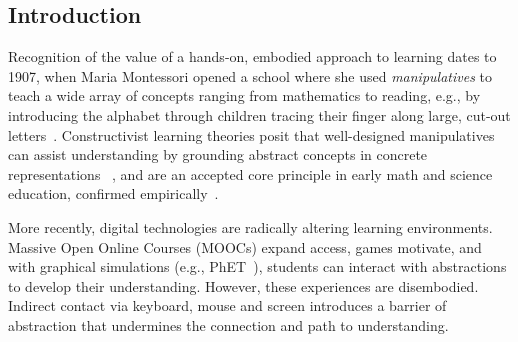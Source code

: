 %
\subsection{Introduction}
Recognition of the value of a hands-on, embodied approach to learning dates to 1907, when
Maria Montessori opened a school where she used \emph{manipulatives} to teach a wide array of concepts ranging from mathematics to reading, e.g., by introducing the alphabet through children tracing their finger along large, cut-out letters~\cite{Montessori1917}.
Constructivist learning theories posit that well-designed manipulatives can assist understanding by grounding abstract concepts in concrete representations ~\cite{papert1980,piaget_science_1970},
and are an accepted core principle in early math and science education, confirmed empirically~\cite{Carbonneau2013}. 

More recently, digital technologies are radically altering learning environments.
Massive Open Online Courses (MOOCs) expand access, games motivate, and with graphical simulations (e.g., PhET~\cite{wieman_phet:_2008}), students can interact with abstractions to develop their understanding.
However, these experiences are disembodied. Indirect contact via keyboard, mouse and screen introduces a barrier of abstraction that undermines the connection and path to understanding. 


